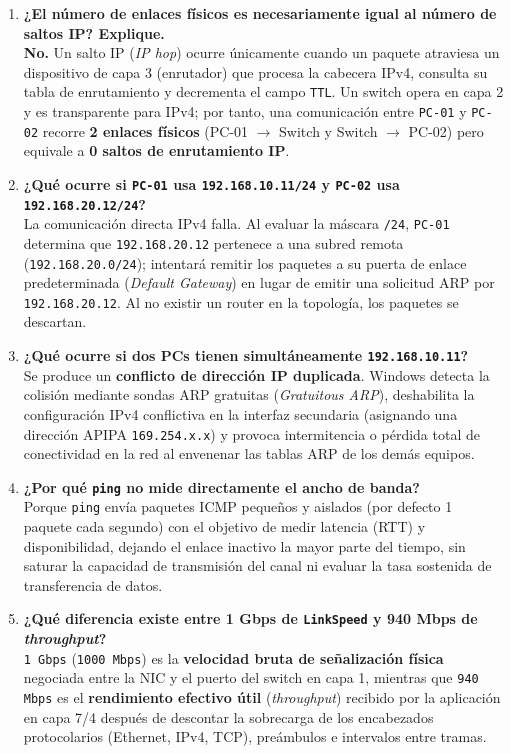\documentclass[11pt, a4paper]{article}
\begin{document}
\begin{enumerate}
    \item \textbf{¿El número de enlaces físicos es necesariamente igual al número de saltos IP? Explique.} \\
    \textbf{No.} Un salto IP (\textit{IP hop}) ocurre únicamente cuando un paquete atraviesa un dispositivo de capa 3 (enrutador) que procesa la cabecera IPv4, consulta su tabla de enrutamiento y decrementa el campo \texttt{TTL}. Un switch opera en capa 2 y es transparente para IPv4; por tanto, una comunicación entre \texttt{PC-01} y \texttt{PC-02} recorre \textbf{2 enlaces físicos} (PC-01 $\rightarrow$ Switch y Switch $\rightarrow$ PC-02) pero equivale a \textbf{0 saltos de enrutamiento IP}.
    \item \textbf{¿Qué ocurre si \texttt{PC-01} usa \texttt{192.168.10.11/24} y \texttt{PC-02} usa \texttt{192.168.20.12/24}?} \\
    La comunicación directa IPv4 falla. Al evaluar la máscara \texttt{/24}, \texttt{PC-01} determina que \texttt{192.168.20.12} pertenece a una subred remota (\texttt{192.168.20.0/24}); intentará remitir los paquetes a su puerta de enlace predeterminada (\textit{Default Gateway}) en lugar de emitir una solicitud ARP por \texttt{192.168.20.12}. Al no existir un router en la topología, los paquetes se descartan.
    \item \textbf{¿Qué ocurre si dos PCs tienen simultáneamente \texttt{192.168.10.11}?} \\
    Se produce un \textbf{conflicto de dirección IP duplicada}. Windows detecta la colisión mediante sondas ARP gratuitas (\textit{Gratuitous ARP}), deshabilita la configuración IPv4 conflictiva en la interfaz secundaria (asignando una dirección APIPA \texttt{169.254.x.x}) y provoca intermitencia o pérdida total de conectividad en la red al envenenar las tablas ARP de los demás equipos.
    \item \textbf{¿Por qué \texttt{ping} no mide directamente el ancho de banda?} \\
    Porque \texttt{ping} envía paquetes ICMP pequeños y aislados (por defecto 1 paquete cada segundo) con el objetivo de medir latencia (RTT) y disponibilidad, dejando el enlace inactivo la mayor parte del tiempo, sin saturar la capacidad de transmisión del canal ni evaluar la tasa sostenida de transferencia de datos.
    \item \textbf{¿Qué diferencia existe entre 1 Gbps de \texttt{LinkSpeed} y 940 Mbps de \textit{throughput}?} \\
    \texttt{1 Gbps} (\texttt{1000 Mbps}) es la \textbf{velocidad bruta de señalización física} negociada entre la NIC y el puerto del switch en capa 1, mientras que \texttt{940 Mbps} es el \textbf{rendimiento efectivo útil} (\textit{throughput}) recibido por la aplicación en capa 7/4 después de descontar la sobrecarga de los encabezados protocolarios (Ethernet, IPv4, TCP), preámbulos e intervalos entre tramas.

\end{enumerate}
\end{document}
